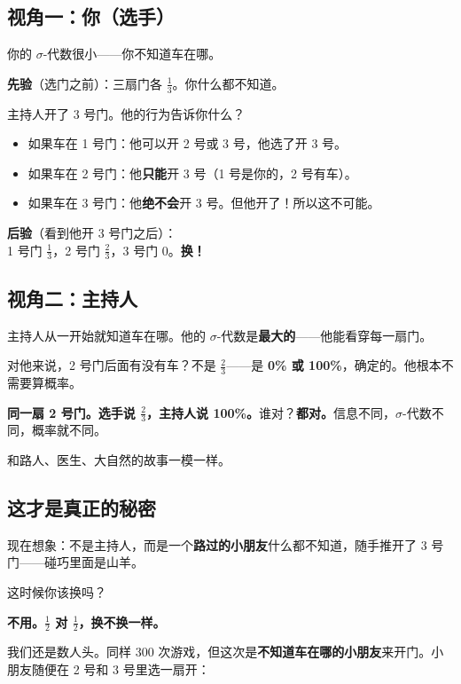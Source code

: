 \documentclass[12pt,a4paper]{article}
\begin{document}
\subsection*{视角一：你（选手）}

你的 $\sigma$-代数很小——你不知道车在哪。

\begin{ideabox}[你的先验和后验]
\textbf{先验}（选门之前）：三扇门各 $\frac{1}{3}$。你什么都不知道。

主持人开了 3 号门。他的行为告诉你什么？
\begin{itemize}[leftmargin=2em]
  \item 如果车在 1 号门：他可以开 2 号或 3 号，他选了开 3 号。
  \item 如果车在 2 号门：他\textbf{只能}开 3 号（1 号是你的，2 号有车）。
  \item 如果车在 3 号门：他\textbf{绝不会}开 3 号。但他开了！所以这不可能。
\end{itemize}

\textbf{后验}（看到他开 3 号门之后）：\\
1 号门 $\frac{1}{3}$，2 号门 $\frac{2}{3}$，3 号门 $0$。\textbf{换！}
\end{ideabox}

\subsection*{视角二：主持人}

主持人从一开始就知道车在哪。他的 $\sigma$-代数是\textbf{最大的}——他能看穿每一扇门。

对他来说，2 号门后面有没有车？不是 $\frac{2}{3}$——是 \textbf{0\% 或 100\%}，确定的。他根本不需要算概率。

\textbf{同一扇 2 号门。选手说 $\frac{2}{3}$，主持人说 100\%。}谁对？\textbf{都对。}信息不同，$\sigma$-代数不同，概率就不同。

和路人、医生、大自然的故事一模一样。

\subsection*{这才是真正的秘密}

现在想象：不是主持人，而是一个\textbf{路过的小朋友}什么都不知道，随手推开了 3 号门——碰巧里面是山羊。

这时候你该换吗？

\textbf{不用。$\frac{1}{2}$ 对 $\frac{1}{2}$，换不换一样。}

我们还是数人头。同样 300 次游戏，但这次是\textbf{不知道车在哪的小朋友}来开门。小朋友随便在 2 号和 3 号里选一扇开：
\end{document}
